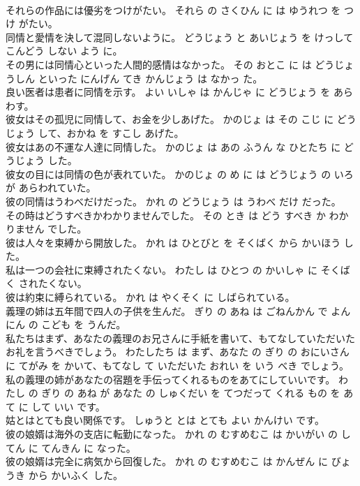 \documentclass[8pt]{extreport}
\begin{document}
\begin{CJK}{UTF8}{min}
\\	それらの作品には優劣をつけがたい。	それら の さくひん に は ゆうれつ を つけ がたい。	
\\	同情と愛情を決して混同しないように。	どうじょう と あいじょう を けっして こんどう しない よう に。	
\\	その男には同情心といった人間的感情はなかった。	その おとこ に は どうじょうしん といった にんげん てき かんじょう は なかっ た。	
\\	良い医者は患者に同情を示す。	よい いしゃ は かんじゃ に どうじょう を あらわす。	
\\	彼女はその孤児に同情して、お金を少しあげた。	かのじょ は その こじ に どうじょう して、おかね を すこし あげた。	
\\	彼女はあの不運な人達に同情した。	かのじょ は あの ふうん な ひとたち に どうじょう した。	
\\	彼女の目には同情の色が表れていた。	かのじょ の め に は どうじょう の いろ が あらわれていた。	
\\	彼の同情はうわべだけだった。	かれ の どうじょう は うわべ だけ だった。	
\\	その時はどうすべきかわかりませんでした。	その とき は どう すべき か わかりません でした。	
\\	彼は人々を束縛から開放した。	かれ は ひとびと を そくばく から かいほう した。	
\\	私は一つの会社に束縛されたくない。	わたし は ひとつ の かいしゃ に そくばく されたくない。	
\\	彼は約束に縛られている。	かれ は やくそく に しばられている。	
\\	義理の姉は五年間で四人の子供を生んだ。	ぎり の あね は ごねんかん で よんにん の こども を うんだ。	
\\	私たちはまず、あなたの義理のお兄さんに手紙を書いて、もてなしていただいたお礼を言うべきでしょう。	わたしたち は まず、あなた の ぎり の おにいさん に てがみ を かいて、もてなし て いただいた おれい を いう べき でしょう。	
\\	私の義理の姉があなたの宿題を手伝ってくれるものをあてにしていいです。	わたし の ぎり の あね が あなた の しゅくだい を てつだって くれる もの を あて に して いい です。	
\\	姑とはとても良い関係です。	しゅうと とは とても よい かんけい です。	
\\	彼の娘婿は海外の支店に転勤になった。	かれ の むすめむこ は かいがい の してん に てんきん に なった。	
\\	彼の娘婿は完全に病気から回復した。	かれ の むすめむこ は かんぜん に びょうき から かいふく した。	

\end{CJK}
\end{document}
